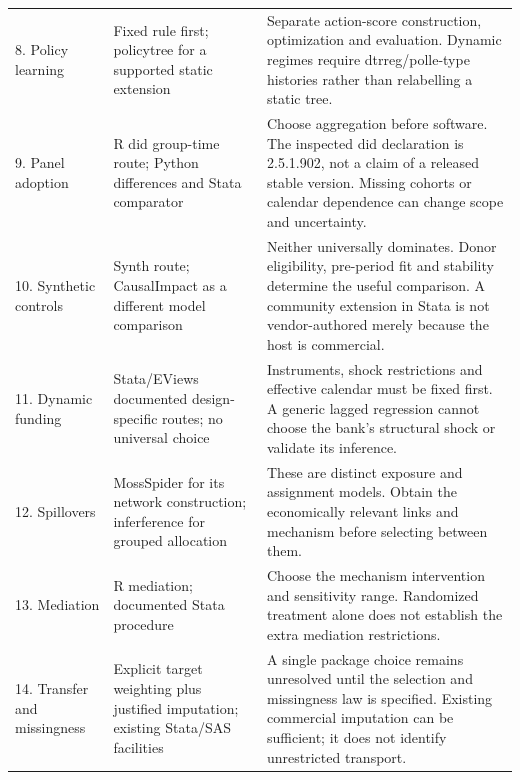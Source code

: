 \begin{longtable}{P{2.2cm}P{4.3cm}P{7.7cm}}
8. Policy learning & Fixed rule first; policytree for a supported static extension & Separate action-score construction, optimization and evaluation. Dynamic regimes require dtrreg/polle-type histories rather than relabelling a static tree. \citep{exec24_policiesr_policytree,exec24_policiesr_dtrreg,exec24_policiesr_polle}\\[5pt]
9. Panel adoption & R did group-time route; Python differences and Stata comparator & Choose aggregation before software. The inspected did declaration is 2.5.1.902, not a claim of a released stable version. Missing cohorts or calendar dependence can change scope and uncertainty. \citep{exec24_panelr_did,exec24_panelpy_differences,exec18_gp_stata_xthdid}\\[5pt]
10. Synthetic controls & Synth route; CausalImpact as a different model comparison & Neither universally dominates. Donor eligibility, pre-period fit and stability determine the useful comparison. A community extension in Stata is not vendor-authored merely because the host is commercial. \citep{exec19_synth_stata_source,exec13_ci_r,exec13_ci_semantics}\\[5pt]
11. Dynamic funding & Stata/EViews documented design-specific routes; no universal choice & Instruments, shock restrictions and effective calendar must be fixed first. A generic lagged regression cannot choose the bank's structural shock or validate its inference. \citep{exec19_dynamic_stata_ab,exec19_dynamic_stata_system,exec19_dynamic_stata_lp,exec19_dynamic_eviews_panel}\\[5pt]
12. Spillovers & MossSpider for its network construction; inferference for grouped allocation & These are distinct exposure and assignment models. Obtain the economically relevant links and mechanism before selecting between them. \citep{exec24_interference_mossspider,exec24_interference_inferference}\\[5pt]
13. Mediation & R mediation; documented Stata procedure & Choose the mechanism intervention and sensitivity range. Randomized treatment alone does not establish the extra mediation restrictions. \citep{exec24_mediation_original,exec24_mediation_sources,exec13_ci_stata_mediate}\\[5pt]
14. Transfer and missingness & Explicit target weighting plus justified imputation; existing Stata/SAS facilities & A single package choice remains unresolved until the selection and missingness law is specified. Existing commercial imputation can be sufficient; it does not identify unrestricted transport. \citep{pearltransport2014,exec21_transport_stata_mi,exec21_transport_sas_mi_intro}\\[5pt]

\end{longtable}
